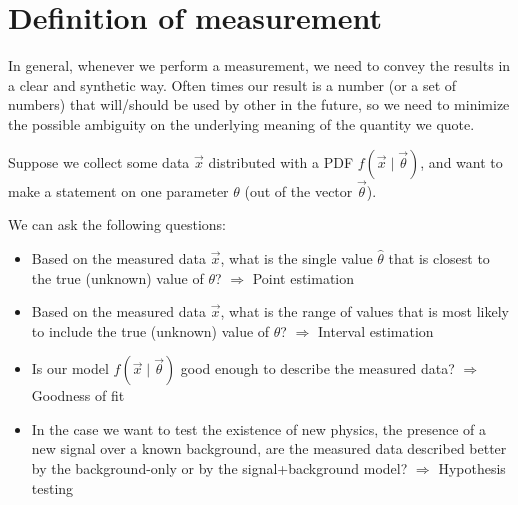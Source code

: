 

\section{Definition of measurement}
\label{sec:def_of_measurement}

In general, whenever we perform a measurement, we need to convey the results in a clear and synthetic way. Often times our result is a number (or a set of numbers) that will/should be used by other in the future, so we need to minimize the possible ambiguity on the underlying meaning of the quantity we quote.

Suppose we collect some data $\vec{x}$ distributed with a PDF $f(\vec{x} \mid \vec{\theta})$, and want to make a statement on one parameter $\theta$ (out of the vector $\vec{\theta}$).

We can ask the following questions:

\begin{itemize}[$\to$]
	\item Based on the measured data $\vec{x}$, what is the single value $\hat{\theta}$ that is closest to the true (unknown) value of $\theta$?
		$\Rightarrow$ Point estimation
	\item Based on the measured data $\vec{x}$, what is the range of values that is most likely to include the true (unknown) value of $\theta$?
		$\Rightarrow$ Interval estimation
	\item Is our model $f(\vec{x} \mid \vec{\theta})$ good enough to describe the measured data?
		$\Rightarrow$ Goodness of fit
	\item In the case we want to test the existence of new physics, \eg the presence of a new signal over a known background, are the measured data described better by the background-only or by the signal+background model?
		$\Rightarrow$ Hypothesis testing
\end{itemize}
